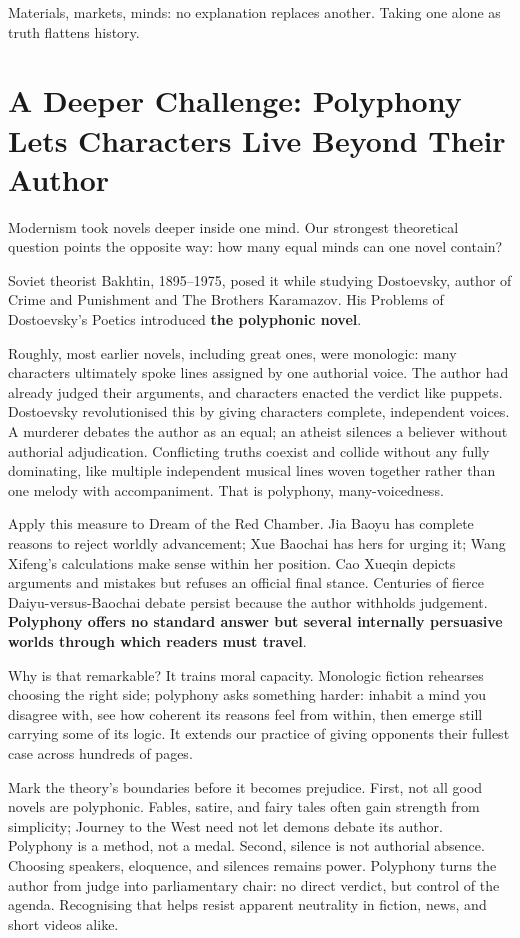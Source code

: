 Materials, markets, minds: no explanation replaces another. Taking one alone as truth flattens history.

\section[Further Challenge: Polyphony]{A Deeper Challenge: Polyphony Lets Characters Live Beyond Their Author}
Modernism took novels deeper inside one mind. Our strongest theoretical question points the opposite way: how many equal minds can one novel contain?

Soviet theorist Bakhtin, 1895--1975, posed it while studying Dostoevsky, author of Crime and Punishment and The Brothers Karamazov. His Problems of Dostoevsky's Poetics introduced \textbf{the polyphonic novel}.

Roughly, most earlier novels, including great ones, were monologic: many characters ultimately spoke lines assigned by one authorial voice. The author had already judged their arguments, and characters enacted the verdict like puppets. Dostoevsky revolutionised this by giving characters complete, independent voices. A murderer debates the author as an equal; an atheist silences a believer without authorial adjudication. Conflicting truths coexist and collide without any fully dominating, like multiple independent musical lines woven together rather than one melody with accompaniment. That is polyphony, many-voicedness.

Apply this measure to Dream of the Red Chamber. Jia Baoyu has complete reasons to reject worldly advancement; Xue Baochai has hers for urging it; Wang Xifeng's calculations make sense within her position. Cao Xueqin depicts arguments and mistakes but refuses an official final stance. Centuries of fierce Daiyu-versus-Baochai debate persist because the author withholds judgement. \textbf{Polyphony offers no standard answer but several internally persuasive worlds through which readers must travel}.

Why is that remarkable? It trains moral capacity. Monologic fiction rehearses choosing the right side; polyphony asks something harder: inhabit a mind you disagree with, see how coherent its reasons feel from within, then emerge still carrying some of its logic. It extends our practice of giving opponents their fullest case across hundreds of pages.

Mark the theory's boundaries before it becomes prejudice. First, not all good novels are polyphonic. Fables, satire, and fairy tales often gain strength from simplicity; Journey to the West need not let demons debate its author. Polyphony is a method, not a medal. Second, silence is not authorial absence. Choosing speakers, eloquence, and silences remains power. Polyphony turns the author from judge into parliamentary chair: no direct verdict, but control of the agenda. Recognising that helps resist apparent neutrality in fiction, news, and short videos alike.

